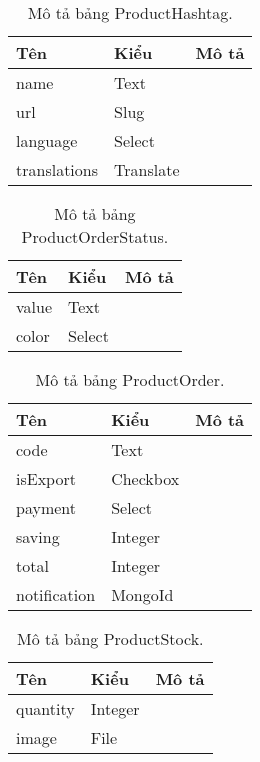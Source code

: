 \begin{table}[p]
	\begin{center}
		\begin{tabular}{ |l|l|l| } 
			\hline
			Tên & Kiểu & Mô tả \\
			\hline
			name & Text & \dotfill \\
			url & Slug & \dotfill \\
			language & Select & \dotfill \\
			translations & Translate & \dotfill \\ 
			\hline
		\end{tabular}
		\caption{Mô tả bảng ProductHashtag.}
		\label{table:ProductHashtag}
	\end{center}
\end{table}


\begin{table}[p]
	\begin{center}
		\begin{tabular}{ |l|l|l| } 
			\hline
			Tên & Kiểu & Mô tả \\
			\hline
			value & Text & \dotfill \\
			color & Select & \dotfill \\ 
			\hline
		\end{tabular}
		\caption{Mô tả bảng ProductOrderStatus.}
		\label{table:ProductOrderStatus}
	\end{center}
\end{table}


\begin{table}[p]
	\begin{center}
		\begin{tabular}{ |l|l|l| } 
			\hline
			Tên & Kiểu & Mô tả \\
			\hline
			code & Text & \dotfill \\
			isExport & Checkbox & \dotfill \\
			payment & Select & \dotfill \\
			saving & Integer & \dotfill \\
			total & Integer & \dotfill \\
			notification & MongoId & \dotfill \\ 
			\hline
		\end{tabular}
		\caption{Mô tả bảng ProductOrder.}
		\label{table:ProductOrder}
	\end{center}
\end{table}


\begin{table}[p]
	\begin{center}
		\begin{tabular}{ |l|l|l| } 
			\hline
			Tên & Kiểu & Mô tả \\
			\hline
			quantity & Integer & \dotfill \\
			image & File & \dotfill \\ 
			\hline
		\end{tabular}
		\caption{Mô tả bảng ProductStock.}
		\label{table:ProductStock}
	\end{center}
\end{table}


